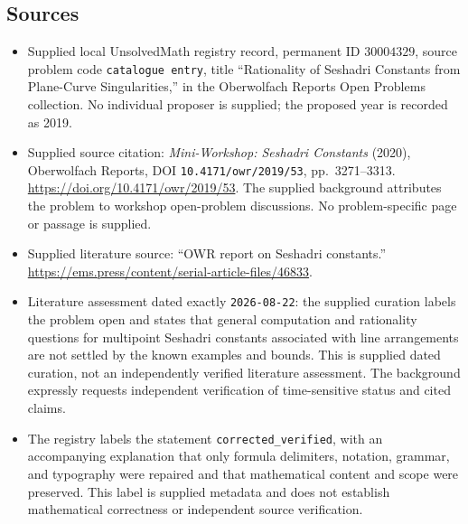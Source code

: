 \documentclass[11pt]{article}
\begin{document}
\subsection{Sources}
\begin{itemize}
\item Supplied local UnsolvedMath registry record, permanent ID \(30004329\), source problem code \texttt{catalogue entry}, title ``Rationality of Seshadri Constants from Plane-Curve Singularities,'' in the Oberwolfach Reports Open Problems collection. No individual proposer is supplied; the proposed year is recorded as 2019.
\item Supplied source citation: \emph{Mini-Workshop: Seshadri Constants} (2020), Oberwolfach Reports, DOI \texttt{10.4171/owr/2019/53}, pp.\ 3271--3313. \url{https://doi.org/10.4171/owr/2019/53}. The supplied background attributes the problem to workshop open-problem discussions. No problem-specific page or passage is supplied.
\item Supplied literature source: ``OWR report on Seshadri constants.'' \url{https://ems.press/content/serial-article-files/46833}.
\item Literature assessment dated exactly \texttt{2026-08-22}: the supplied curation labels the problem open and states that general computation and rationality questions for multipoint Seshadri constants associated with line arrangements are not settled by the known examples and bounds. This is supplied dated curation, not an independently verified literature assessment. The background expressly requests independent verification of time-sensitive status and cited claims.
\item The registry labels the statement \texttt{corrected\_verified}, with an accompanying explanation that only formula delimiters, notation, grammar, and typography were repaired and that mathematical content and scope were preserved. This label is supplied metadata and does not establish mathematical correctness or independent source verification.
\end{itemize}
\end{document}
